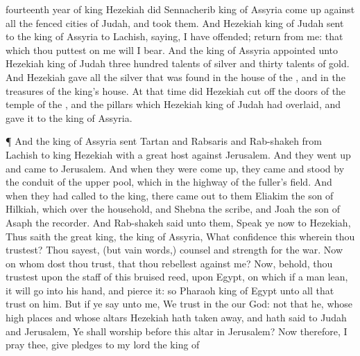 {fourteenth
year of
king
Hezekiah did
Sennacherib
king of
Assyria come
up against all the
fenced
cities of
Judah, and
took them.
And
Hezekiah
king of
Judah
sent to the
king of
Assyria to
Lachish,
saying, I have
offended;
return from me: that which thou
puttest on me will I
bear. And the
king of
Assyria
appointed unto
Hezekiah
king of
Judah
three
hundred
talents of
silver and
thirty
talents of
gold.
And
Hezekiah
gave
{} all the
silver that was
found in the
house of the
{}, and in the
treasures of the
king’s
house.
At that
time did
Hezekiah cut
off
{} the
doors of the
temple of the
{}, and
{} the
pillars which
Hezekiah
king of
Judah had
overlaid, and
gave it to the
king of
Assyria.
\par }{\PP {}¶ And the
king of
Assyria
sent
Tartan and
Rabsaris and
Rab-shakeh from
Lachish to
king
Hezekiah with a
great
host against
Jerusalem. And they went
up and
came to
Jerusalem. And when they were come
up, they
came and
stood by the
conduit of the
upper
pool, which
{} in the
highway of the
fuller’s
field.
And when they had
called to the
king, there came
out to them
Eliakim the
son of
Hilkiah, which
{} over the
household, and
Shebna the
scribe, and
Joah the
son of
Asaph the
recorder.
And
Rab-shakeh
said unto them,
Speak ye now to
Hezekiah, Thus
saith the
great
king, the
king of
Assyria, What
confidence
{} this wherein thou
trustest?
Thou
sayest, (but
{}
vain
words,)
{}
counsel and
strength for the
war. Now on whom dost thou
trust, that thou
rebellest against me?
Now, behold, thou
trustest upon the
staff of this
bruised
reed,
{} upon
Egypt, on which if a
man
lean, it will
go into his
hand, and
pierce it: so
{}
Pharaoh
king of
Egypt unto all that
trust on him.
But if ye
say unto me, We
trust in the
{} our
God:
{} not that he, whose high
places and whose
altars
Hezekiah hath taken
away, and hath
said to
Judah and
Jerusalem, Ye shall
worship
before this
altar in
Jerusalem?
Now therefore, I pray thee, give
pledges to my
lord the
king of
}
